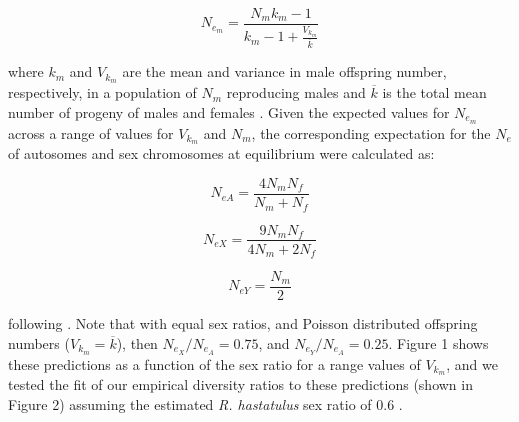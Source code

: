 \documentclass[9pt,twocolumn,twoside]{gsajnl}
\begin{document}
\begin{equation}
N_{e_{m}}=\frac{N_{m}k_{m}-1}{k_{m}-1+\frac{V_{k_{m}}}{\overline{k}}} \label{eq:Vk}
\end{equation}

where $k_{m}$ and $V_{k_{m}}$ are the mean and variance in male offspring number, respectively, in a population of $N_{m}$ reproducing males and $\overline{k}$ is the total mean number of progeny of males and females \citep{kimura1964number}. Given the expected values for $N_e_{m}$ across a range of values for $V_{k_{m}}$ and $N_{m}$, the corresponding expectation for the $N_{e}$ of autosomes and sex chromosomes at equilibrium were calculated as:

\begin{equation}
N_{e{A}} = \frac{4N_{m}N_{f}}{N_{m}+N_{f}} \label{eq:Ne}
\end{equation}

\begin{equation}
N_{e{X}} = \frac{9N_{m}N_{f}}{4N_{m}+2N_{f}} \label{eq:NeX}
\end{equation}

\begin{equation}
N_{e{Y}} = \frac{N_{m}}{2} \label{eq:NeY}
\end{equation}

following \citep{wright1931evolution}. Note that with equal sex ratios, and Poisson distributed offspring numbers ($V_{k_{m}} = \overline{k}$), then $N_{e_{X}}/N_{e_{A}} = 0.75$, and $N_{e_{Y}}/N_{e_{A}} = 0.25$. Figure 1 shows these predictions as a function of the sex ratio for a range values of $V_{k_{m}}$, and we tested the fit of our empirical diversity ratios to these predictions (shown in Figure 2) assuming the estimated \textit{R. hastatulus} sex ratio of 0.6 \citep{pickup2013influence}.
\end{document}
